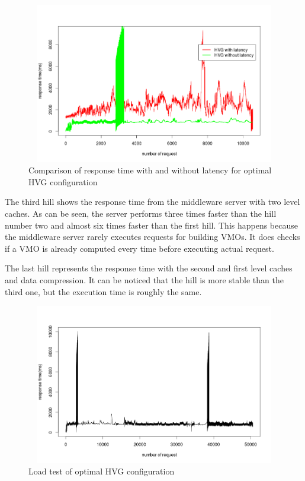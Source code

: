 \begin{figure}[h!]
    \centering
    \includegraphics[width=15cm,height=7cm,keepaspectratio]{images/hvg_latency_comparison.png}
    \caption{Comparison of response time with and without latency for optimal HVG configuration}
    \label{fig:hvg_comparison}
\end{figure}


The third hill shows the response time from the middleware server with two level caches. As can be seen, the server performs three times faster than the hill number two and almost six times faster than the first hill. This happens because the middleware server rarely executes requests for building VMOs. It does checks if a VMO is already computed every time before executing actual request. 

The last hill represents the response time with the second and first level caches and data compression. It can be noticed that the hill is more stable than the third one, but the execution time is roughly the same.


\begin{figure}[h!]
    \centering
    \includegraphics[width=15cm,height=7cm,keepaspectratio]{images/hql_loadtest.png}
    \caption{Load test of optimal HVG configuration}
    \label{fig:hvg_loadtest}
\end{figure}

